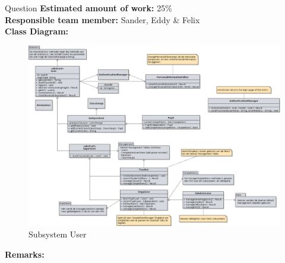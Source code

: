 \begin{subsection}{Question}
	\textbf{Estimated amount of work:} 25\% \\
    \textbf{Responsible team member:} Sander, Eddy \& Felix \\
	\textbf{Class Diagram:} \\
	
	\begin{figure}[!h]
	  \centering
		\includegraphics[width=1\textwidth]{../class_diagrams/user.png}
	  \caption{Subsystem User}
	  \label{subsystem_question}
	\end{figure}
	
	\textbf{Remarks:} \\
	
\end{subsection}
